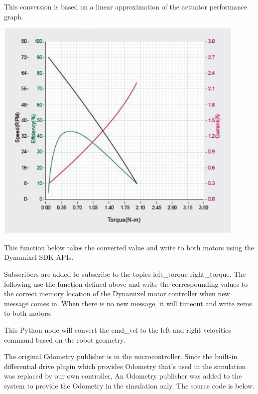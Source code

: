 \documentclass[12]{article}
\begin{document}
This conversion is based on a linear approximation of the actuator performance graph.

\begin{center}
	\includegraphics[width=\linewidth]{images/xm430_performance.png}\\
\end{center}

This function below takes the converted value and write to both motors using the Dynamixel SDK APIs. 


Subscribers are added to subscribe to the topics \/left\_torque \/right\_torque. 
The following use the function defined above and write the correspounding values to the correct memory location of the Dynamixel motor controller when new message comes in. 
When there is no new message, it will timeout and write zeros to both motors. 

 
This Python node will convert the cmd\_vel to the left and right velocities command based on the robot geometry. 



The original Odometry publisher is in the microcontroller. Since the built-in differential drive plugin which provides 
Odometry that's used in the simulation was replaced by our own controller,
An Odometry publisher was added to the system to provide the Odometry in the simulation only. The source code is below. 
\end{document}
